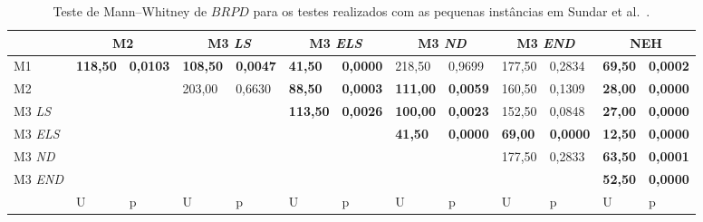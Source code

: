 \begin{table}[H]
\caption{Teste de Mann–Whitney de $BRPD$ para os testes realizados com as pequenas instâncias em Sundar et al.~\cite{sundarHybridArtificialBee2017}.}
\label{tab:P1_hipothesis_BRPD}
\setlength{\tabcolsep}{3pt} %
\begin{tabular}{l|ll|ll|ll|ll|ll|ll}
                       & \multicolumn{2}{c|}{M2}            & \multicolumn{2}{c|}{M3 \textit{LS}} & \multicolumn{2}{c|}{M3 \textit{ELS}} & \multicolumn{2}{c|}{M3 \textit{ND}} & \multicolumn{2}{c|}{M3 \textit{END}} & \multicolumn{2}{c}{NEH}          \\ \hline
M1                     & \textbf{118,50} & \textbf{0,0103} & \textbf{108,50}          & \textbf{0,0047}          & \textbf{41,50}            & \textbf{0,0000}          & 218,50                   & 0,9699                   & 177,50                   & 0,2834                    & \textbf{69,50} & \textbf{0,0002} \\
M2                     & \textbf{}       & \textbf{}       & 203,00                   & 0,6630                   & \textbf{88,50}            & \textbf{0,0003}          & \textbf{111,00}          & \textbf{0,0059}          & 160,50                   & 0,1309                    & \textbf{28,00} & \textbf{0,0000} \\
M3 \textit{LS}         & \textbf{}       & \textbf{}       & \textbf{}                & \textbf{}                & \textbf{113,50}           & \textbf{0,0026}          & \textbf{100,00}          & \textbf{0,0023}          & 152,50                   & 0,0848                    & \textbf{27,00} & \textbf{0,0000} \\
M3 \textit{ELS}        & \textbf{}       & \textbf{}       & \textbf{}                & \textbf{}                & \textbf{}                 & \textbf{}                & \textbf{41,50}           & \textbf{0,0000}          & \textbf{69,00}           & \textbf{0,0000}           & \textbf{12,50} & \textbf{0,0000} \\
M3 \textit{ND}         & \textbf{}       & \textbf{}       & \textbf{}                & \textbf{}                & \textbf{}                 & \textbf{}                & \textbf{}                & \textbf{}                & 177,50                   & 0,2833                    & \textbf{63,50} & \textbf{0,0001} \\
M3 \textit{END}         & \textbf{}       & \textbf{}       & \textbf{}                & \textbf{}                & \textbf{}                 & \textbf{}                & \textbf{}                & \textbf{}                & \textbf{}                & \textbf{}                 & \textbf{52,50} & \textbf{0,0000} \\ \hline
                                 & U               & p               & U                        & p                        & U                         & p                        & U                        & p                        & U                        & p                         & U              & p              
\end{tabular}
\end{table}

